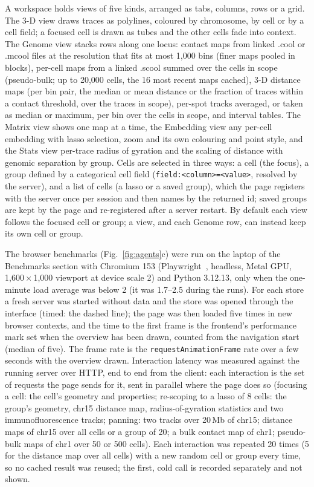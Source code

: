 \documentclass[11pt]{article}
\newcommand{\pkg}[1]{\texttt{#1}}
\begin{document}
A workspace holds views of five kinds, arranged as tabs, columns, rows or a grid.
The 3-D view draws traces as polylines, coloured by chromosome, by cell or by a cell field; a focused cell is drawn as tubes and the other cells fade into context.
The Genome view stacks rows along one locus: contact maps from linked .cool or .mcool files at the resolution that fits at most 1,000 bins (finer maps pooled in blocks), per-cell maps from a linked .scool summed over the cells in scope (pseudo-bulk; up to 20,000 cells, the 16 most recent maps cached), 3-D distance maps (per bin pair, the median or mean distance or the fraction of traces within a contact threshold, over the traces in scope), per-spot tracks averaged, or taken as median or maximum, per bin over the cells in scope, and interval tables.
The Matrix view shows one map at a time, the Embedding view any per-cell embedding with lasso selection, zoom and its own colouring and point style, and the Stats view per-trace radius of gyration and the scaling of distance with genomic separation by group.
Cells are selected in three ways: a cell (the focus), a group defined by a categorical cell field (\pkg{field:<column>=<value>}, resolved by the server), and a list of cells (a lasso or a saved group), which the page registers with the server once per session and then names by the returned id; saved groups are kept by the page and re-registered after a server restart.
By default each view follows the focused cell or group; a view, and each Genome row, can instead keep its own cell or group.

The browser benchmarks (Fig.~\ref{fig:agents}c) were run on the laptop of the Benchmarks section with Chromium 153 (Playwright~\citep{playwright}, headless, Metal GPU, 1,600\,$\times$\,1,000 viewport at device scale 2) and Python 3.12.13, only when the one-minute load average was below 2 (it was 1.7--2.5 during the runs).
For each store a fresh server was started without data and the store was opened through the interface (timed: the dashed line); the page was then loaded five times in new browser contexts, and the time to the first frame is the frontend's performance mark set when the overview has been drawn, counted from the navigation start (median of five).
The frame rate is the \pkg{requestAnimationFrame} rate over a few seconds with the overview drawn.
Interaction latency was measured against the running server over HTTP, end to end from the client: each interaction is the set of requests the page sends for it, sent in parallel where the page does so (focusing a cell: the cell's geometry and properties; re-scoping to a lasso of 8 cells: the group's geometry, chr15 distance map, radius-of-gyration statistics and two immunofluorescence tracks; panning: two tracks over 20\,Mb of chr15; distance maps of chr15 over all cells or a group of 20; a bulk contact map of chr1; pseudo-bulk maps of chr1 over 50 or 500 cells).
Each interaction was repeated 20 times (5 for the distance map over all cells) with a new random cell or group every time, so no cached result was reused; the first, cold call is recorded separately and not shown.
\end{document}
